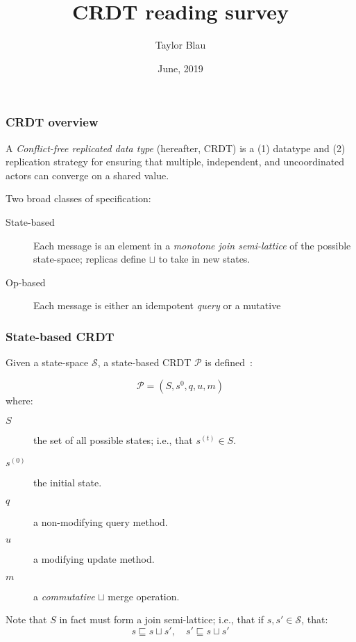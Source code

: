 \documentclass[aspectratio=169,compress]{beamer}
\title{CRDT reading survey}
\author{Taylor Blau}
\institute{University of Washington}
\date{June, 2019}
\begin{document}
  \frame{\titlepage}

  \begin{frame}
    \frametitle{CRDT overview}

    A \textit{Conflict-free replicated data type} (hereafter, CRDT) is a (1)
    datatype and (2) replication strategy for ensuring that multiple,
    independent, and uncoordinated actors can converge on a shared value.

    \vspace{1em}

    Two broad classes of specification:
    \begin{description}
      \item[State-based] Each message is an element in a \textit{monotone join
        semi-lattice} of the possible state-space; replicas define $\sqcup$ to
        take in new states.
      \item[Op-based] Each message is either an idempotent \textit{query} or a
        mutative
    \end{description}
  \end{frame}

  \begin{frame}
    \frametitle{State-based CRDT}

    Given a state-space $\mathcal{S}$, a state-based CRDT $\mathcal{P}$ is
    defined~\parencite{shapiro11}:

    \[
      \mathcal{P} = (S, s^0, q, u, m)
    \]
    where:
    \begin{description}
      \item[$S$] the set of all possible states; i.e., that $s^{(t)} \in S$.
      \item[$s^{(0)}$] the initial state.
      \item[$q$] a non-modifying query method.
      \item[$u$] a modifying update method.
      \item[$m$] a \textit{commutative} $\sqcup$ merge operation.
    \end{description}

    \vspace{1em}

    Note that $S$ in fact must form a join semi-lattice; i.e., that if $s, s'
    \in \mathcal{S}$, that:
    \[
      s \sqsubseteq s \sqcup s',\quad s' \sqsubseteq s \sqcup s'
    \]
  \end{frame}
\end{document}
